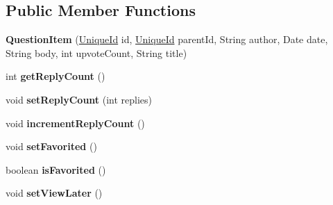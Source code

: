 \subsection*{Public Member Functions}
\begin{DoxyCompactItemize}
\item 
\hypertarget{classcom_1_1ualberta_1_1team17_1_1_question_item_ae748a809ae8264b2776a91f774117616}{{\bfseries Question\+Item} (\hyperlink{classcom_1_1ualberta_1_1team17_1_1_unique_id}{Unique\+Id} id, \hyperlink{classcom_1_1ualberta_1_1team17_1_1_unique_id}{Unique\+Id} parent\+Id, String author, Date date, String body, int upvote\+Count, String title)}\label{classcom_1_1ualberta_1_1team17_1_1_question_item_ae748a809ae8264b2776a91f774117616}

\item 
\hypertarget{classcom_1_1ualberta_1_1team17_1_1_question_item_a2d823138a400b17f158c14fbc5833003}{int {\bfseries get\+Reply\+Count} ()}\label{classcom_1_1ualberta_1_1team17_1_1_question_item_a2d823138a400b17f158c14fbc5833003}

\item 
\hypertarget{classcom_1_1ualberta_1_1team17_1_1_question_item_ab05b7018a247999882bcb5c780db465e}{void {\bfseries set\+Reply\+Count} (int replies)}\label{classcom_1_1ualberta_1_1team17_1_1_question_item_ab05b7018a247999882bcb5c780db465e}

\item 
\hypertarget{classcom_1_1ualberta_1_1team17_1_1_question_item_af2a5a89e1d83d7c5262399ee750055f0}{void {\bfseries increment\+Reply\+Count} ()}\label{classcom_1_1ualberta_1_1team17_1_1_question_item_af2a5a89e1d83d7c5262399ee750055f0}

\item 
\hypertarget{classcom_1_1ualberta_1_1team17_1_1_question_item_a7da159f36fae685d6881e5cafa3fc5a4}{void {\bfseries set\+Favorited} ()}\label{classcom_1_1ualberta_1_1team17_1_1_question_item_a7da159f36fae685d6881e5cafa3fc5a4}

\item 
\hypertarget{classcom_1_1ualberta_1_1team17_1_1_question_item_aafefb98d0273e5d74f381e328012708b}{boolean {\bfseries is\+Favorited} ()}\label{classcom_1_1ualberta_1_1team17_1_1_question_item_aafefb98d0273e5d74f381e328012708b}

\item 
\hypertarget{classcom_1_1ualberta_1_1team17_1_1_question_item_a200181f1a6477549288788515c05205d}{void {\bfseries set\+View\+Later} ()}\label{classcom_1_1ualberta_1_1team17_1_1_question_item_a200181f1a6477549288788515c05205d}


\end{DoxyCompactItemize}
